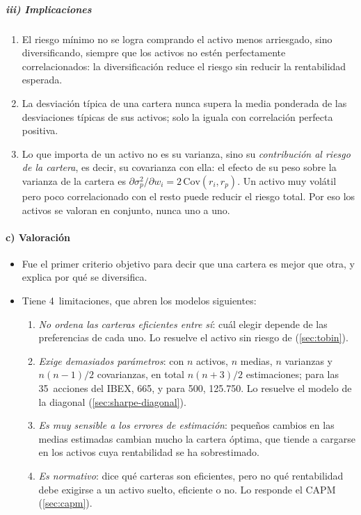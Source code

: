 \documentclass[11pt]{article}
\begin{document}
\subparagraph{iii) Implicaciones}

\begin{enumerate}
\item El riesgo mínimo no se logra comprando el activo menos arriesgado, sino diversificando, siempre que los activos no estén perfectamente correlacionados: la diversificación reduce el riesgo sin reducir la rentabilidad esperada.
\item La desviación típica de una cartera nunca supera la media ponderada de las desviaciones típicas de sus activos; solo la iguala con correlación perfecta positiva.
\item Lo que importa de un activo no es su varianza, sino su \emph{contribución al riesgo de la cartera}, es decir, su covarianza con ella: el efecto de su peso sobre la varianza de la cartera es $\partial\sigma_p^2/\partial w_i=2\,\mathrm{Cov}(r_i,r_p)$. Un activo muy volátil pero poco correlacionado con el resto puede reducir el riesgo total. Por eso los activos se valoran en conjunto, nunca uno a uno.
\end{enumerate}

\paragraph{c) Valoración}

\begin{itemize}
\item Fue el primer criterio objetivo para decir que una cartera es mejor que otra, y explica por qué se diversifica.
\item Tiene 4~limitaciones, que abren los modelos siguientes:
  \begin{enumerate}
  \item \emph{No ordena las carteras eficientes entre sí}: cuál elegir depende de las preferencias de cada uno. Lo resuelve el activo sin riesgo de  (\ref{sec:tobin}).
  \item \emph{Exige demasiados parámetros}: con $n$ activos, $n$ medias, $n$ varianzas y $n(n-1)/2$ covarianzas, en total $n(n+3)/2$ estimaciones; para las 35~acciones del IBEX, 665, y para 500, 125.750. Lo resuelve el modelo de la diagonal (\ref{sec:sharpe-diagonal}).
  \item \emph{Es muy sensible a los errores de estimación}: pequeños cambios en las medias estimadas cambian mucho la cartera óptima, que tiende a cargarse en los activos cuya rentabilidad se ha sobrestimado\nocite{Michaud1989Markowitz}.
  \item \emph{Es normativo}: dice qué carteras son eficientes, pero no qué rentabilidad debe exigirse a un activo suelto, eficiente o no. Lo responde el CAPM (\ref{sec:capm}).
  \end{enumerate}
\end{itemize}
\end{document}
